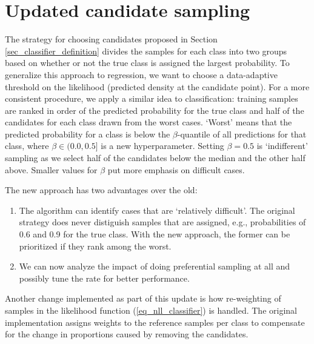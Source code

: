 \section{Updated candidate sampling}
\label{sec_updated_candidate_sampling}
%
\begin{center}\end{center}
%
The strategy for choosing candidates proposed in Section \ref{sec_classifier_definition} divides the samples for each class into two groups based on whether or not the true class is assigned the largest probability.
To generalize this approach to regression, we want to choose a data-adaptive threshold on the likelihood (predicted density at the candidate point).
For a more consistent procedure, we apply a similar idea to classification:
training samples are ranked in order of the predicted probability for the true class and half of the candidates for each class drawn from the worst cases.
`Worst' means that the predicted probability for a class is below the $\beta$-quantile of all predictions for that class, where $\beta\in(0.0,0.5]$ is a new hyperparameter.
Setting $\beta=0.5$ is `indifferent' sampling as we select half of the candidates below the median and the other half above.
Smaller values for $\beta$ put more emphasis on difficult cases.\par
%
The new approach has two advantages over the old:
%
\begin{enumerate}
\item The algorithm can identify cases that are `relatively difficult'.
The original strategy does never distiguish samples that are assigned, e.g., probabilities of 0.6 and 0.9 for the true class.
With the new approach, the former can be prioritized if they rank among the worst.
%
\item We can now analyze the impact of doing preferential sampling at all and possibly tune the rate for better performance.
\end{enumerate}
%
Another change implemented as part of this update is how re-weighting of samples in the likelihood function (\ref{eq_nll_classifier}) is handled.
The original implementation assigns weights to the reference samples per class to compensate for the change in proportions caused by removing the candidates.
